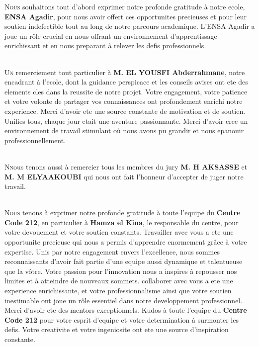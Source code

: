 \documentclass[a4paper, 11pt, openany]{report}
\begin{document}
\newpage



\lettrine[nindent=0em, slope=-.5em]{\color{Eblue}N}{ous} souhaitons tout d'abord exprimer notre profonde gratitude à notre ecole, \textbf{ENSA Agadir}, pour nous avoir offert ces opportunites precieuses et pour leur soutien indefectible tout au long de notre parcours academique. L'ENSA Agadir a joue un rôle crucial en nous offrant un environnement d'apprentissage enrichissant et en nous preparant à relever les defis professionnels.

\ \\

\lettrine[nindent=0em, slope=-.5em]{\color{Eblue}U}{n} remerciement tout particulier à \textbf{M. EL YOUSFI Abderrahmane}, notre encadrant à l'ecole, dont la guidance perspicace et les conseils avises ont ete des elements cles dans la reussite de notre projet. Votre engagement, votre patience et votre volonte de partager vos connaissances ont profondement enrichi notre experience. Merci d'avoir ete une source constante de motivation et de soutien. Unifies tous, chaque jour etait une aventure passionnante. Merci d'avoir cree un environnement de travail stimulant où nous avons pu grandir et nous epanouir professionnellement.

\ \\

\lettrine[nindent=0em, slope=-.5em]{\color{Eblue}N}{n}ous tenons aussi à remercier tous les membres du jury \textbf{M. H AKSASSE} et \textbf{M. M ELYAAKOUBI} qui nous ont fait l’honneur d’accepter de juger notre travail.

\ \\

\lettrine[nindent=0em, slope=-.5em]{\color{Eblue}N}{ous} tenons à exprimer notre profonde gratitude à toute l'equipe du \textbf{Centre Code 212}, en particulier à \textbf{Hamza el Kina}, le responsable du centre, pour votre devouement et votre soutien constants. Travailler avec vous a ete une opportunite precieuse qui nous a permis d'apprendre enormement grâce à votre expertise. Unis par notre engagement envers l'excellence, nous sommes reconnaissants d'avoir fait partie d'une equipe aussi dynamique et talentueuse que la vôtre. Votre passion pour l'innovation nous a inspires à repousser nos limites et à atteindre de nouveaux sommets. collaborer avec vous a ete une experience enrichissante, et votre professionnalisme ainsi que votre soutien inestimable ont joue un rôle essentiel dans notre developpement professionnel. Merci d'avoir ete des mentors exceptionnels. Kudos à toute l'equipe du \textbf{Centre Code 212} pour votre esprit d'equipe et votre determination à surmonter les defis. Votre creativite et votre ingeniosite ont ete une source d'inspiration constante.
\end{document}
